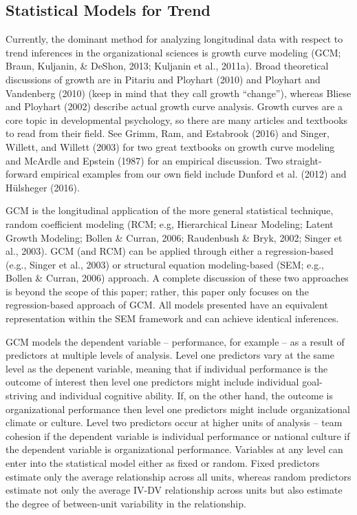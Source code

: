 \documentclass[english,,man]{apa6}
\theoremstyle{definition}
\theoremstyle{definition}
\theoremstyle{definition}
\theoremstyle{remark}
\begin{document}
\hypertarget{statistical-models-for-trend}{%
\subsection{Statistical Models for
Trend}\label{statistical-models-for-trend}}

Currently, the dominant method for analyzing longitudinal data with
respect to trend inferences in the organizational sciences is growth
curve modeling (GCM; Braun, Kuljanin, \& DeShon, 2013; Kuljanin et al.,
2011a). Broad theoretical discussions of growth are in Pitariu and
Ployhart (2010) and Ployhart and Vandenberg (2010) (keep in mind that
they call growth \enquote{change}), whereas Bliese and Ployhart (2002)
describe actual growth curve analysis. Growth curves are a core topic in
developmental psychology, so there are many articles and textbooks to
read from their field. See Grimm, Ram, and Estabrook (2016) and Singer,
Willett, and Willett (2003) for two great textbooks on growth curve
modeling and McArdle and Epstein (1987) for an empirical discussion. Two
straight-forward empirical examples from our own field include Dunford
et al. (2012) and Hülsheger (2016).

GCM is the longitudinal application of the more general statistical
technique, random coefficient modeling (RCM; e.g, Hierarchical Linear
Modeling; Latent Growth Modeling; Bollen \& Curran, 2006; Raudenbush \&
Bryk, 2002; Singer et al., 2003). GCM (and RCM) can be applied through
either a regression-based (e.g., Singer et al., 2003) or structural
equation modeling-based (SEM; e.g., Bollen \& Curran, 2006) approach. A
complete discussion of these two approaches is beyond the scope of this
paper; rather, this paper only focuses on the regression-based approach
of GCM. All models presented have an equivalent representation within
the SEM framework and can achieve identical inferences.

GCM models the dependent variable -- performance, for example -- as a
result of predictors at multiple levels of analysis. Level one
predictors vary at the same level as the depenent variable, meaning that
if individual performance is the outcome of interest then level one
predictors might include individual goal-striving and individual
cognitive ability. If, on the other hand, the outcome is organizational
performance then level one predictors might include organizational
climate or culture. Level two predictors occur at higher units of
analysis -- team cohesion if the dependent variable is individual
performance or national culture if the dependent variable is
organizational performance. Variables at any level can enter into the
statistical model either as fixed or random. Fixed predictors estimate
only the average relationship across all units, whereas random
predictors estimate not only the average IV-DV relationship across units
but also estimate the degree of between-unit variability in the
relationship.
\end{document}
